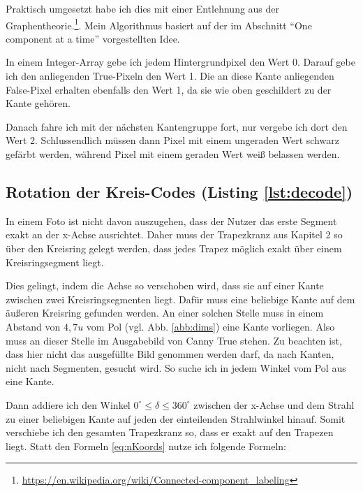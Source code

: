 Praktisch umgesetzt habe ich dies mit einer Entlehnung aus der Graphentheorie.\footnote{\url{https://en.wikipedia.org/wiki/Connected-component_labeling}}. Mein Algorithmus basiert auf der im Abschnitt "`One component at a time"' vorgestellten Idee.

In einem Integer-Array gebe ich jedem Hintergrundpixel den Wert 0. Darauf gebe ich den anliegenden True-Pixeln den Wert 1. Die an diese Kante anliegenden False-Pixel erhalten ebenfalls den Wert 1, da sie wie oben geschildert zu der Kante gehören.

Danach fahre ich mit der nächsten Kantengruppe fort, nur vergebe ich dort den Wert 2. Schlussendlich müssen dann Pixel mit einem ungeraden Wert schwarz gefärbt werden, während Pixel mit einem geraden Wert weiß belassen werden.

\subsection {Rotation der Kreis-Codes (Listing \ref{lst:decode})}
In einem Foto ist nicht davon auszugehen, dass der Nutzer das erste Segment exakt an der x-Achse ausrichtet. Daher muss der Trapezkranz aus Kapitel 2 so über den Kreisring gelegt werden, dass jedes Trapez möglich exakt über einem Kreisringsegment liegt. 

Dies gelingt, indem die Achse so verschoben wird, dass sie auf einer Kante zwischen zwei Kreisringsegmenten liegt. Dafür muss eine beliebige Kante auf dem äußeren Kreisring gefunden werden. An einer solchen Stelle muss in einem Abstand von \(4,7u\) vom Pol (vgl. Abb. \ref{abb:dims}) eine Kante vorliegen. Also muss an dieser Stelle im Ausgabebild von Canny True stehen. Zu beachten ist, dass hier nicht das ausgefüllte Bild genommen werden darf, da nach Kanten, nicht nach Segmenten, gesucht wird.
So suche ich in jedem Winkel vom Pol aus eine Kante.

Dann addiere ich den Winkel \(0^{\circ} \le \delta \le 360^{\circ}\) zwischen der x-Achse und dem Strahl zu einer beliebigen Kante auf jeden der einteilenden Strahlwinkel hinauf. Somit verschiebe ich den gesamten Trapezkranz so, dass er exakt auf den Trapezen liegt. Statt den Formeln \ref{eq:nKoords} nutze ich folgende Formeln:

